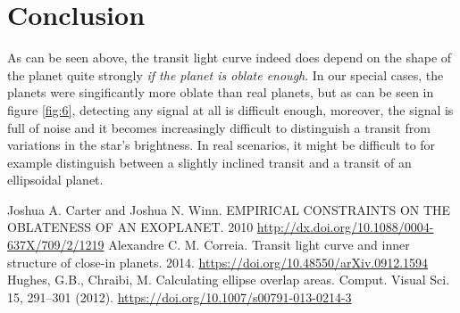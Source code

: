 \documentclass[10pt]{article}
\numberwithin{equation}{subsection}
\begin{document}
\section{Conclusion}
As can be seen above, the transit light curve indeed does depend on the shape of the planet
quite strongly \emph{if the planet is oblate enough}. In our special cases, the planets
were singificantly more oblate than real planets, but as can be seen in figure \ref{fig:6},
detecting any signal at all is difficult enough, moreover, the signal is full of noise
and it becomes increasingly difficult to distinguish a transit from variations in the star's
brightness. In real scenarios, it might be difficult to for example distinguish between
a slightly inclined transit and a transit of an ellipsoidal planet.
\begin{thebibliography}{5}
   Joshua A. Carter and Joshua N. Winn. EMPIRICAL CONSTRAINTS ON THE OBLATENESS OF AN EXOPLANET. 2010 \url{http://dx.doi.org/10.1088/0004-637X/709/2/1219}
   Alexandre C. M. Correia. Transit light curve and inner structure of close-in planets. 2014. \url{https://doi.org/10.48550/arXiv.0912.1594}
   Hughes, G.B., Chraibi, M. Calculating ellipse overlap areas. Comput. Visual Sci. 15, 291–301 (2012). \url{https://doi.org/10.1007/s00791-013-0214-3}
\end{thebibliography}
\end{document}
